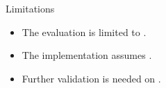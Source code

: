 \begin{frame}{Limitations}

\begin{itemize}
    \item The evaluation is limited to .
    \item The implementation assumes .
    \item Further validation is needed on .
\end{itemize}

\end{frame}
